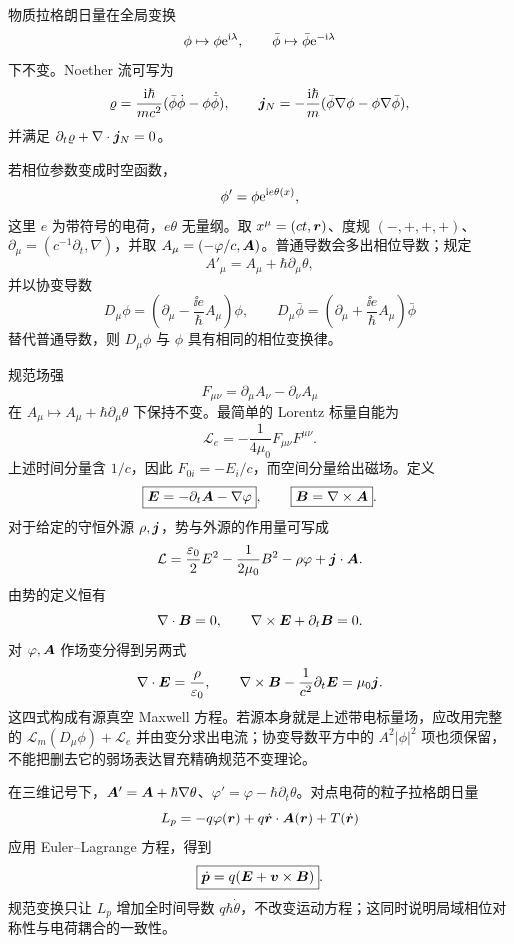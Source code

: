 物质拉格朗日量在全局变换
\[
 \phi\mapsto\phi\mathrm e^{\mathrm i\lambda},\qquad
 \bar\phi\mapsto\bar\phi\mathrm e^{-\mathrm i\lambda}
\]
下不变。Noether 流可写为
\[
 \varrho=\frac{\mathrm i\hbar}{mc^2}
 (\bar\phi\dot\phi-\phi\dot{\bar\phi}),
 \qquad
 \bm{j}_N=-\frac{\mathrm i\hbar}{m}
 (\bar\phi\nabla\phi-\phi\nabla\bar\phi),
\]
并满足 $\partial_t\varrho+\nabla\cdot\bm{j}_N=0$。

若相位参数变成时空函数，
\[
 \phi'=\phi\mathrm e^{\mathrm i e\theta(x)},
\]
这里 $e$ 为带符号的电荷，$e\theta$ 无量纲。取 $x^\mu=(ct,\bm{r})$、度规 $(-,+,+,+)$、$\partial_\mu=(c^{-1}\partial_t,\nabla)$，并取 $A_\mu=(-\varphi/c,\bm{A})$。普通导数会多出相位导数；规定
\[
 A'_\mu=A_\mu+\hbar\partial_\mu\theta,
\]
并以协变导数
\[
 D_\mu\phi=\left(\partial_\mu-\frac{\ii e}{\hbar}A_\mu\right)\phi,
 \qquad
 D_\mu\bar\phi=\left(\partial_\mu+\frac{\ii e}{\hbar}A_\mu\right)\bar\phi
\]
替代普通导数，则 $D_\mu\phi$ 与 $\phi$ 具有相同的相位变换律。

规范场强
\[
 F_{\mu\nu}=\partial_\mu A_\nu-\partial_\nu A_\mu
\]
在 $A_\mu\mapsto A_\mu+\hbar\partial_\mu\theta$ 下保持不变。最简单的 Lorentz 标量自能为
\[
 \mathcal L_e=-\frac1{4\mu_0}F_{\mu\nu}F^{\mu\nu}.
\]
上述时间分量含 $1/c$，因此 $F_{0i}=-E_i/c$，而空间分量给出磁场。定义
\[
 \boxed{\bm{E}=-\partial_t\bm{A}-\nabla\varphi},
 \qquad
 \boxed{\bm{B}=\nabla\times\bm{A}}.
\]
对于给定的守恒外源 $\rho,\bm{j}$，势与外源的作用量可写成
\[
 \mathcal L=\frac{\varepsilon_0}{2}E^2-\frac1{2\mu_0}B^2
 -\rho\varphi+\bm{j}\cdot\bm{A}.
\]
由势的定义恒有
\[
 \nabla\cdot\bm{B}=0,
 \qquad \nabla\times\bm{E}+\partial_t\bm{B}=0.
\]
对 $\varphi,\bm{A}$ 作场变分得到另两式
\[
 \nabla\cdot\bm{E}=\frac\rho{\varepsilon_0},
 \qquad
 \nabla\times\bm{B}-\frac1{c^2}\partial_t\bm{E}=\mu_0\bm{j}.
\]
这四式构成有源真空 Maxwell 方程。若源本身就是上述带电标量场，应改用完整的 $\mathcal L_m(D_\mu\phi)+\mathcal L_e$ 并由变分求出电流；协变导数平方中的 $A^2|\phi|^2$ 项也须保留，不能把删去它的弱场表达冒充精确规范不变理论。

在三维记号下，$\bm{A}'=\bm{A}+\hbar\nabla\theta$、$\varphi'=\varphi-\hbar\partial_t\theta$。对点电荷的粒子拉格朗日量
\[
 L_p=-q\varphi(\bm{r})+q\dot{\bm{r}}\cdot\bm{A}(\bm{r})+T(\dot{\bm{r}})
\]
应用 Euler--Lagrange 方程，得到
\[
 \boxed{\dot{\bm{p}}=q(\bm{E}+\bm{v}\times\bm{B})}.
\]
规范变换只让 $L_p$ 增加全时间导数 $q\hbar\dot\theta$，不改变运动方程；这同时说明局域相位对称性与电荷耦合的一致性。
